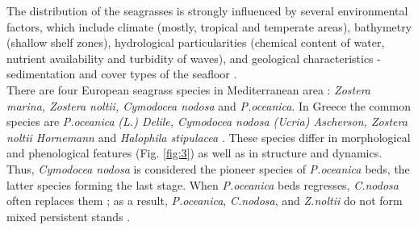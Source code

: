 \documentclass[10pt, a4paper]{article}
\begin{document}
The distribution of the seagrasses is strongly influenced by several environmental factors, which
include climate (mostly, tropical and temperate areas), bathymetry (shallow shelf zones), hydrological
particularities (chemical content of water, nutrient availability and turbidity of waves), and geological 
characteristics - sedimentation and cover types of the seafloor \cite{McKenzie06}\label{McKenzie06}.\\
There are four European seagrass species in Mediterranean area \cite{Borum04}\label{Borum04}: \textit{Zostera marina,
Zostera noltii, Cymodocea nodosa} and \textit{P.oceanica}. In Greece the common species are \textit{P.oceanica}
\textit{(L.) Delile, Cymodocea nodosa (Ucria) Ascherson, Zostera noltii Hornemann} and \textit{Halophila
stipulacea} \cite{Amoutzopoulou-Schina05}\label{Amoutzopoulou-Schina05}. 
These species differ in morphological and phenological features (Fig. \ref{fig:3}) as well as in structure and dynamics. Thus, \textit{Cymodocea nodosa} is
considered the pioneer species of \textit{P.oceanica} beds, the latter species forming the last stage. When \textit{P.oceanica} beds regresses, \textit{C.nodosa} often replaces them \cite{DenHartog77}\label{DenHartog77}; as a result, \textit{P.oceanica},
\textit{C.nodosa}, and \textit{Z.noltii} do not form mixed persistent stands \cite{Buia91}\label{Buia91}.
\end{document}
